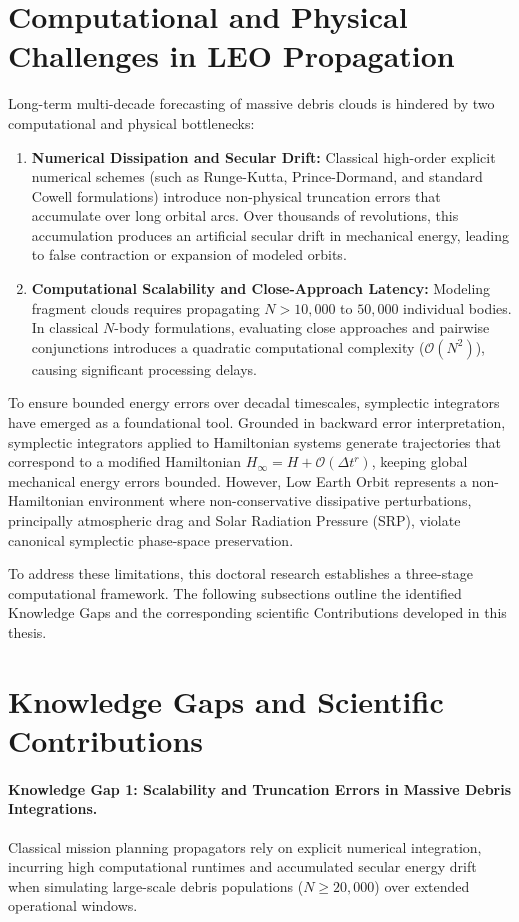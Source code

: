 \documentclass[12pt,letterpaper,twoside]{book}
\begin{document}
\section{Computational and Physical Challenges in LEO Propagation}

Long-term multi-decade forecasting of massive debris clouds is hindered by two computational and physical bottlenecks:
\begin{enumerate}
    \item \textbf{Numerical Dissipation and Secular Drift:} Classical high-order explicit numerical schemes (such as Runge-Kutta, Prince-Dormand, and standard Cowell formulations) introduce non-physical truncation errors that accumulate over long orbital arcs. Over thousands of revolutions, this accumulation produces an artificial secular drift in mechanical energy, leading to false contraction or expansion of modeled orbits.
    \item \textbf{Computational Scalability and Close-Approach Latency:} Modeling fragment clouds requires propagating $N > 10,000$ to $50,000$ individual bodies. In classical $N$-body formulations, evaluating close approaches and pairwise conjunctions introduces a quadratic computational complexity ($\mathcal{O}(N^2)$), causing significant processing delays.
\end{enumerate}

To ensure bounded energy errors over decadal timescales, symplectic integrators have emerged as a foundational tool. Grounded in backward error interpretation, symplectic integrators applied to Hamiltonian systems generate trajectories that correspond to a modified Hamiltonian $H_\infty = H + \mathcal{O}(\Delta t^r)$, keeping global mechanical energy errors bounded. However, Low Earth Orbit represents a non-Hamiltonian environment where non-conservative dissipative perturbations, principally atmospheric drag and Solar Radiation Pressure (SRP), violate canonical symplectic phase-space preservation.

To address these limitations, this doctoral research establishes a three-stage computational framework. The following subsections outline the identified Knowledge Gaps and the corresponding scientific Contributions developed in this thesis.

\section{Knowledge Gaps and Scientific Contributions}

\paragraph{Knowledge Gap 1: Scalability and Truncation Errors in Massive Debris Integrations.}
Classical mission planning propagators rely on explicit numerical integration, incurring high computational runtimes and accumulated secular energy drift when simulating large-scale debris populations ($N \ge 20,000$) over extended operational windows.
\end{document}
